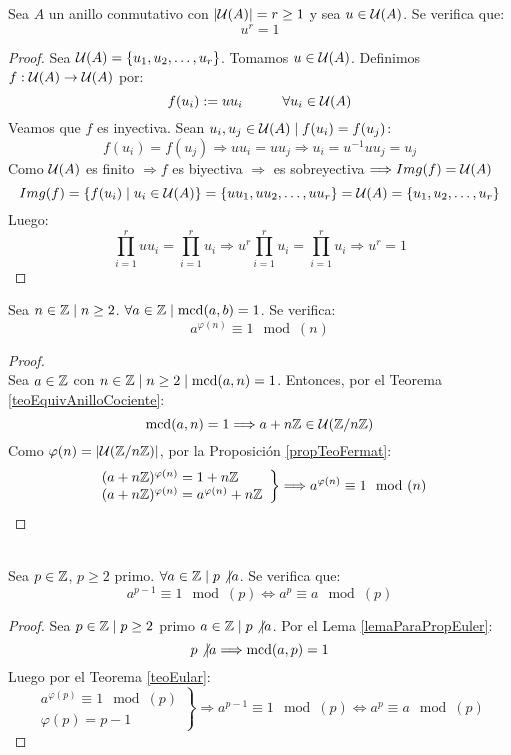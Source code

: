 \begin{prop}
    \label{propTeoFermat}
    Sea $A$ un anillo conmutativo con $|\mathcal{U}(A)|=r \geq 1$ y sea $u \in \mathcal{U}(A)$. Se verifica que:
    $$u^r = 1$$
\begin{proof}
    Sea $\mathcal{U}(A) = \{u_1, u_2, \ldots, u_r\}$. Tomamos $u \in \mathcal{U}(A)$.\newline
    Definimos $f:\mathcal{U}(A)\rightarrow \mathcal{U}(A)$ por:
    $$f(u_i):=uu_i\hspace{1cm}\forall u_i \in \mathcal{U}(A)$$
    Veamos que $f$ es inyectiva. Sean $u_i, u_j \in \mathcal{U}(A) \mid f(u_i)=f(u_j)$:
    $$f(u_i)=f(u_j) \Longrightarrow uu_i = uu_j \Longrightarrow u_i = u^{-1}uu_j = u_j$$
    Como $\mathcal{U}(A)$ es finito $\Longrightarrow f$ es biyectiva $\Longrightarrow$ es sobreyectiva $\Longrightarrow Img(f)=\mathcal{U}(A)$
    $$Img(f) = \{f(u_i) \mid u_i \in \mathcal{U}(A)\} = \{uu_1, uu_2, \ldots, uu_r\} = \mathcal{U}(A) = \{u_1, u_2, \ldots, u_r\}$$
    Luego:
    $$\prod_{i=1}^r uu_i = \prod_{i=1}^r u_i \Longrightarrow u^r\prod_{i=1}^r u_i = \prod_{i=1}^r u_i \Longrightarrow u^r = 1$$
\end{proof}
\end{prop}


\begin{teo}[de Euler]
    \label{teoEular}
    Sea $n \in \mathbb Z \mid n\geq 2$. $\forall a \in \mathbb Z \mid \operatorname{mcd}(a,b)=1$. Se verifica:
    $$a^{\varphi(n)}\equiv 1\mod(n)$$
\begin{proof}
    \ \\
    Sea $a \in \mathbb Z$ con $n \in \mathbb Z \mid n\geq 2 \mid \operatorname{mcd}(a,n)=1$. Entonces, por el Teorema \ref{teoEquivAnilloCociente}:
    $$\operatorname{mcd}(a,n)=1 \Longrightarrow a+n\mathbb Z \in \mathcal{U}(\mathbb Z/n\mathbb Z)$$
    Como $\varphi(n) = |\mathcal{U}(\mathbb Z/n\mathbb Z)|$, por la Proposición \ref{propTeoFermat}:
    $$\left. \begin{array}{l}
            (a+n\mathbb Z)^{\varphi(n)}=1+n\mathbb Z \\
            (a+n\mathbb Z)^{\varphi(n)}=a^{\varphi(n)}+n\mathbb Z
        \end{array} \right\} \Longrightarrow a^{\varphi(n)}\equiv 1\mod(n)$$
\end{proof}
\end{teo}

\begin{teo}
    \ \\
    \label{teoFermat}
    Sea $p \in \mathbb Z$, $p\geq 2$ primo. $\forall a \in \mathbb Z \mid p\not|a$. Se verifica que:
    $$a^{p-1}\equiv 1\mod(p) \Longleftrightarrow a^p\equiv a\mod(p)$$
\begin{proof}
    Sea $p \in \mathbb Z \mid p\geq 2$ primo $a \in \mathbb Z \mid p\not| a$. Por el Lema \ref{lemaParaPropEuler}:
    $$p\not|a \Longrightarrow \operatorname{mcd}(a,p)=1$$
    Luego por el Teorema \ref{teoEular}:
    $$\left. \begin{array}{l}
            a^{\varphi(p)}\equiv 1\mod(p) \\
            \varphi(p) = p-1
        \end{array} \right\} \Longrightarrow a^{p-1} \equiv 1\mod(p) \Longleftrightarrow a^p \equiv a\mod(p)$$
\end{proof}
\end{teo}

